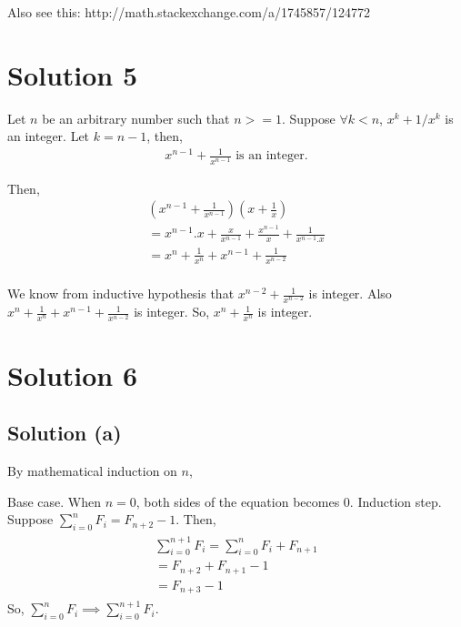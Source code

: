 \documentclass{article}
\begin{document}
Also see this: http://math.stackexchange.com/a/1745857/124772

\section{Solution 5}

Let $n$ be an arbitrary number such that $n >= 1$. Suppose $\forall k < n$, $x^k + 1/x^k$ is an integer. Let $k = n-1$, then,
\begin{gather*}
  x^{n-1} + \frac{1}{x^{n-1}} \text{ is an integer.}
\end{gather*}

Then,
\begin{gather*}
  (x^{n-1} + \frac{1}{x^{n-1}})(x + \frac{1}{x}) \\
  = x^{n-1}.x + \frac{x}{x^{n-1}} + \frac{x^{n-1}}{x} + \frac{1}{x^{n-1}.x} \\
  = x^n + \frac{1}{x^n} + x^{n-1} + \frac{1}{x^{n-2}} \\
\end{gather*}

We know from inductive hypothesis that $x^{n-2} + \frac{1}{x^{n-2}}$  is integer. Also $x^n + \frac{1}{x^n} + x^{n-1} + \frac{1}{x^{n-2}}$ is integer. So, $x^n + \frac{1}{x^n}$ is integer.

\section{Solution 6}
\subsection{Solution (a)}
By mathematical induction on $n$,

Base case. When $n = 0$, both sides of the equation becomes $0$.
Induction step. Suppose $\sum_{i=0}^{n} F_i = F_{n+2} - 1$. Then,
\begin{gather*}
  \begin{align}
  \sum_{i=0}^{n+1} F_i = \sum_{i=0}^{n} F_i + F_{n+1} \\
  = F_{n+2} + F_{n+1} - 1 \\
    = F_{n+3} - 1
  \end{align}
\end{gather*}
So, $\sum_{i=0}^{n} F_i \implies \sum_{i=0}^{n+1} F_i$.
\end{document}
